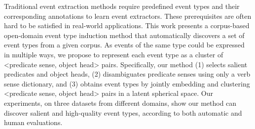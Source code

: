 Traditional event extraction methods require predefined event types and their corresponding annotations to learn event extractors. These prerequisites are often hard to be satisfied in real-world applications. This work presents a corpus-based open-domain event type induction method that automatically discovers a set of event types from a given corpus. As events of the same type could be expressed in multiple ways, we propose to represent each event type as a cluster of <predicate sense, object head> pairs. Specifically, our method (1) selects salient predicates and object heads, (2) disambiguates predicate senses using only a verb sense dictionary, and (3) obtains event types by jointly embedding and clustering <predicate sense, object head> pairs in a latent spherical space. Our experiments, on three datasets from different domains, show our method can discover salient and high-quality event types, according to both automatic and human evaluations.

